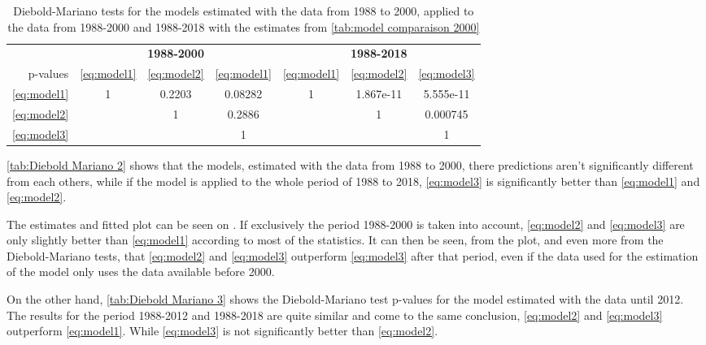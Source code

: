 \documentclass[12pt,a4paper,oneside]{book}
\begin{document}
\begin{table}[htp!]
     \caption{Diebold-Mariano tests for the models estimated with the data from 1988 to 2000, applied to the data from 1988-2000 and 1988-2018 with the estimates from \autoref{tab:model comparaison 2000}}
    \label{tab:Diebold Mariano 2}
    \centering \footnotesize
    \begin{tabular}{| r | c c c | c c c |}
 \multicolumn{1}{r}{} &    \multicolumn{3}{c}{\textbf{1988-2000}} &    \multicolumn{3}{c}{\textbf{1988-2018}} \\ \cline{2-7}
 \multicolumn{0}{r|}{p-values}	& \ref{eq:model1} & \ref{eq:model2} & \ref{eq:model1} & \ref{eq:model1} & \ref{eq:model2} & \ref{eq:model3} \\ \cline{1-7}
 \ref{eq:model1} & 1 & 0.2203 & 0.08282  & 1 & 1.867e-11 & 5.555e-11 \\ 
 \ref{eq:model2} &   & 1  	& 0.2886  	&   & 1 & 0.000745 \\
 \ref{eq:model3} &   &    & 1 &   &   & 1   \\ \cline{1-7}
\end{tabular}
\end{table}

\autoref{tab:Diebold Mariano 2} shows that the models, estimated with the data from 1988 to 2000, there predictions aren't significantly different from each others, while if the model is applied to the whole period of 1988 to 2018, \ref{eq:model3} is significantly better than \ref{eq:model1} and \ref{eq:model2}.

The estimates and fitted plot can be seen on .
If exclusively the period 1988-2000 is taken into account, \ref{eq:model2} and \ref{eq:model3} are only slightly better than \ref{eq:model1} according to most of the statistics.
It can then be seen, from the plot, and even more from the Diebold-Mariano tests, that \ref{eq:model2} and \ref{eq:model3} outperform \ref{eq:model3} after that period, even if the data used for the estimation of the model only uses the data available before 2000.




On the other hand, \autoref{tab:Diebold Mariano 3} shows the Diebold-Mariano test p-values for the model estimated with the data until 2012. The results for the period 1988-2012 and 1988-2018 are quite similar and come to the same conclusion, \ref{eq:model2} and \ref{eq:model3} outperform \ref{eq:model1}. While \ref{eq:model3} is not significantly better than \ref{eq:model2}.
\end{document}
